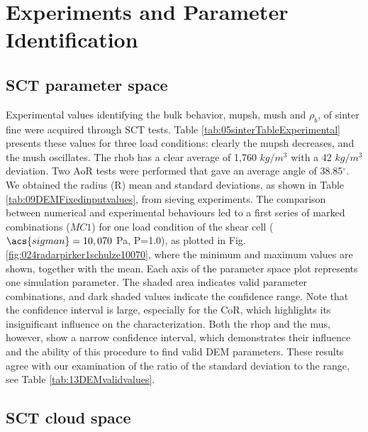   

\section{Experiments and Parameter Identification}
\label{sec:experimentsparameteridentification}



\subsection{SCT parameter space}
\label{subsec:sctparameterspace}

Experimental values identifying the bulk behavior, \acs{mupsh}, \acs{mush} and $\rho_{b}$, 
of sinter fine were acquired through \acs{SCT} tests. 
Table \ref{tab:05sinterTableExperimental} presents
these values for three load conditions: clearly the \acs{mupsh} decreases, and 
the \acs{mush} oscillates.
The \acs{rhob} has a clear average of 1,760 $kg/m^3$ with a 42 
$kg/m^3$ deviation.
Two \acs{AoR} tests were performed that gave an average angle of
38.85$^\circ$.
We obtained the radius (\acs{R}) mean and standard
deviations, as shown in Table
\ref{tab:09DEMFixedinputvalues}, from sieving experiments.
The comparison between numerical and experimental behaviours led to a first
series of marked combinations ($MC1$) for one load condition of
the shear cell ($\acs{sigman} = 10,070$ Pa, P=1.0), as plotted in Fig.
\ref{fig:024radarpirker1schulze10070}, where 
the minimum and maximum values are shown, together with the mean. 
Each axis of the parameter space plot represents one simulation parameter.
The shaded area indicates valid parameter combinations, and dark shaded
values indicate the confidence range.
Note that the confidence interval is large, 
especially for the \acs{CoR}, which highlights its insignificant influence on the
characterization.
Both the \acs{rhop}  and the \acs{mus}, however, show a narrow confidence interval, 
which demonstrates their influence and the ability of this procedure to find
valid \acs{DEM} parameters.
These results agree with our examination of the ratio of the standard deviation
to the range, see Table \ref{tab:13DEMvalidvalues}.

\subsection{SCT cloud space}
\label{subsec:sctcloudspace}

